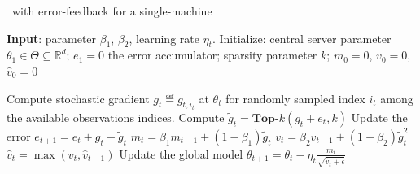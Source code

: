 \documentclass[11pt]{article}
\begin{document}
\begin{algorithm}[H]
\caption{\algo\ with error-feedback for a single-machine} \label{alg:sparsamssingle}
\begin{algorithmic}[1]

\STATE \textbf{Input}: parameter $\beta_1$, $\beta_2$, learning rate $\eta_t$. 
\STATE Initialize: central server parameter $\theta_{1} \in \Theta \subseteq \mathbb R^d$; $e_{1}=0$ the error accumulator; sparsity parameter $k$; $m_0=0$, $v_0=0$, $\hat v_0=0$

\STATE  Compute stochastic gradient $g_{t} \eqdef g_{t,i_t}$ at $\theta_t$ for randomly sampled index $i_t$ among the available observations indices. \label{line:stochgrad} 
\STATE  Compute $\tilde g_{t}=\textbf{Top-$k$}(g_{t}+e_{t},k)$ \label{line:topksingle} 
\STATE  Update the error $e_{t+1}=e_{t}+g_{t}-\tilde g_{t}$
\STATE $m_t=\beta_1 m_{t-1}+(1-\beta_1)\tilde g_t$
\STATE $v_t=\beta_2 v_{t-1}+(1-\beta_2)\tilde g_t^2$
\STATE $\hat v_t=\max(v_t,\hat v_{t-1})$ \label{line:vsingle}
\STATE Update the global model $\theta_{t+1}=\theta_{t}-\eta_t\frac{m_t}{\sqrt{\hat v_t+\epsilon}}$

\ENDFOR
\end{algorithmic}
\end{algorithm}
\end{document}
